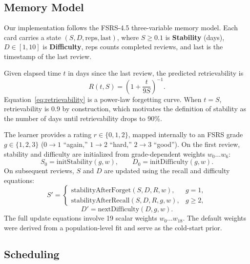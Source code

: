 \documentclass[conference]{IEEEtran}
\begin{document}
\subsection{Memory Model}

Our implementation follows the FSRS-4.5 three-variable memory model. Each card carries a state $(S, D, \text{reps}, \text{last})$, where $S \geq 0.1$ is \textbf{Stability} (days), $D \in [1, 10]$ is \textbf{Difficulty}, reps counts completed reviews, and last is the timestamp of the last review.

Given elapsed time $t$ in days since the last review, the predicted retrievability is
\begin{equation}
R(t, S) = \left(1 + \frac{t}{9S}\right)^{-1}.
\label{eq:retrievability}
\end{equation}
Equation~\eqref{eq:retrievability} is a power-law forgetting curve. When $t = S$, retrievability is 0.9 by construction, which motivates the definition of stability as the number of days until retrievability drops to 90\%.

The learner provides a rating $r \in \{0, 1, 2\}$, mapped internally to an FSRS grade $g \in \{1, 2, 3\}$ ($0 \rightarrow 1$ ``again,'' $1 \rightarrow 2$ ``hard,'' $2 \rightarrow 3$ ``good''). On the first review, stability and difficulty are initialized from grade-dependent weights $w_0 \ldots w_6$:
\begin{equation}
S_0 = \text{initStability}(g, w), \qquad D_0 = \text{initDifficulty}(g, w).
\end{equation}
On subsequent reviews, $S$ and $D$ are updated using the recall and difficulty equations:
\begin{equation}
S' = \begin{cases}
\text{stabilityAfterForget}(S, D, R, w), & g = 1,\\
\text{stabilityAfterRecall}(S, D, R, g, w), & g \geq 2,
\end{cases}
\end{equation}
\begin{equation}
D' = \text{nextDifficulty}(D, g, w).
\end{equation}
The full update equations involve 19 scalar weights $w_0 \ldots w_{18}$. The default weights were derived from a population-level fit and serve as the cold-start prior.

\subsection{Scheduling}
\end{document}
